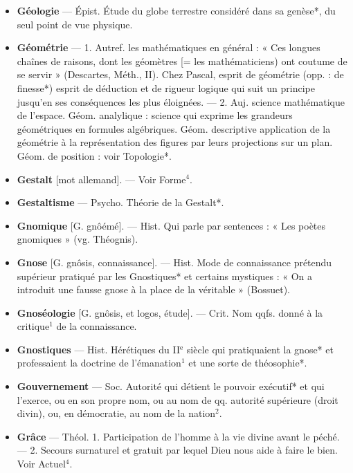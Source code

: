 \begin{itemize}[leftmargin=1cm, label=, itemsep=1pt]
\item {\bf Géologie} — Épist. Étude du globe terrestre considéré dans sa genèse*,
du seul point de vue physique.

\item {\bf Géométrie} — 1. Autref. les mathématiques en général : « Ces longues
chaînes de raisons, dont les géomètres [= les mathématiciens) ont
coutume de se servir » (Descartes,
Méth., II). Chez Pascal, esprit de
géométrie (opp. : de finesse*)
esprit de déduction et de rigueur
logique qui suit un principe jusqu'en ses conséquences les plus
éloignées. — 2. Auj. science mathématique de l’espace. Géom. analylique : science qui exprime les
grandeurs géométriques en formules
algébriques. Géom. descriptive
application de la géométrie à la représentation des figures par leurs
projections sur un plan. Géom. de
position : voir Topologie*.

\item {\bf Gestalt} [mot allemand]. — Voir Forme$^4$.

\item {\bf Gestaltisme} — Psycho. Théorie de la
Gestalt*.

\item {\bf Gnomique} [G. gnôémé]. — Hist. Qui
parle par sentences : « Les poètes
gnomiques » (vg. Théognis).

\item {\bf Gnose} [G. gnôsis, connaissance]. —
Hist. Mode de connaissance prétendu supérieur pratiqué par les
Gnostiques* et certains mystiques :
« On a introduit une fausse gnose à
la place de la véritable » (Bossuet).

\item {\bf Gnoséologie} [G. gnôsis, et logos, étude].
— Crit. Nom qqfs. donné à la critique$^1$ de la connaissance.

\item {\bf Gnostiques} — Hist. Hérétiques du
{\footnotesize II}$^\text{e}$ siècle qui pratiquaient la gnose*
et professaient la doctrine de l’émanation$^1$ et une sorte de théosophie*.

\item {\bf Gouvernement} — Soc. Autorité qui
détient le pouvoir exécutif* et qui
l'exerce, ou en son propre nom,
ou au nom de qq. autorité supérieure (droit divin), ou, en démocratie, au nom de la nation$^2$.

\item {\bf Grâce} — Théol. 1. Participation de
l’homme à la vie divine avant le
péché. — 2. Secours surnaturel et
gratuit par lequel Dieu nous aide à
faire le bien. Voir Actuel$^4$.


\end{itemize}
